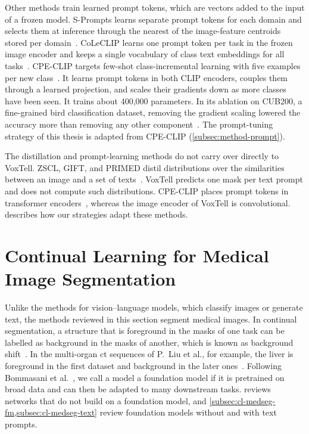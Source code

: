 Other methods train learned prompt tokens, which are vectors added to the input of a frozen model.
S-Prompts learns separate prompt tokens for each domain and selects them at inference through the nearest of the image-feature centroids stored per domain~\cite{wang2023spromptslearningpretrainedtransformers}.
CoLeCLIP learns one prompt token per task in the frozen image encoder and keeps a single vocabulary of class text embeddings for all tasks~\cite{li2024coleclipopendomaincontinuallearning}.
CPE-CLIP targets few-shot class-incremental learning with five examples per new class~\cite{D_Alessandro_2023}.
It learns prompt tokens in both CLIP encoders, couples them through a learned projection, and scales their gradients down as more classes have been seen.
It trains about 400{,}000 parameters.
In its ablation on CUB200, a fine-grained bird classification dataset, removing the gradient scaling lowered the accuracy more than removing any other component~\cite[Sec.~5.5, Fig.~2]{D_Alessandro_2023}.
The prompt-tuning strategy of this thesis is adapted from CPE-CLIP (\cref{subsec:method-prompt}).

The distillation and prompt-learning methods do not carry over directly to VoxTell.
ZSCL, GIFT, and PRIMED distil distributions over the similarities between an image and a set of texts~\cite{zheng2023preventingzeroshottransferdegradation,wu2024gift,chen2025forgingdynamicmemoryretrievalguided}.
VoxTell predicts one mask per text prompt and does not compute such distributions.
CPE-CLIP places prompt tokens in transformer encoders~\cite{D_Alessandro_2023}, whereas the image encoder of VoxTell is convolutional.
 describes how our strategies adapt these methods.

\section[Continual Learning for Medical Image Segmentation]{Continual Learning for Medical Image\texorpdfstring{\newline}{ } Segmentation}
\label{sec:cl-medseg}

Unlike the methods for vision--language models, which classify images or generate text, the methods reviewed in this section segment medical images.
In continual segmentation, a structure that is foreground in the masks of one task can be labelled as background in the masks of another, which is known as background shift~\cite{cermelli2020modelingbackgroundincrementallearning}.
In the multi-organ \gls{ct} sequences of P.~Liu et al., for example, the liver is foreground in the first dataset and background in the later ones~\cite{liu2022learningincrementallysegmentmultiple}.
Following Bommasani et al.~\cite[p.~3]{bommasani2021opportunities}, we call a model a foundation model if it is pretrained on broad data and can then be adapted to many downstream tasks.
 reviews networks that do not build on a foundation model, and \cref{subsec:cl-medseg-fm,subsec:cl-medseg-text} review foundation models without and with text prompts.

